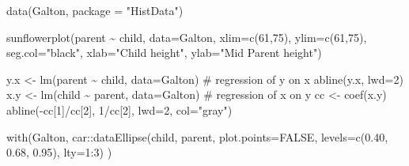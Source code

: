 \documentclass[
  letterpaper,
  10pt,
  krantz2]{krantz}
\makeatletter
\newenvironment{Shaded}{\begin{snugshade}}{\end{snugshade}}
\newcommand{\AttributeTok}[1]{\textcolor[rgb]{0.40,0.45,0.13}{#1}}
\newcommand{\CommentTok}[1]{\textcolor[rgb]{0.37,0.37,0.37}{#1}}
\newcommand{\ConstantTok}[1]{\textcolor[rgb]{0.56,0.35,0.01}{#1}}
\newcommand{\DecValTok}[1]{\textcolor[rgb]{0.68,0.00,0.00}{#1}}
\newcommand{\FloatTok}[1]{\textcolor[rgb]{0.68,0.00,0.00}{#1}}
\newcommand{\FunctionTok}[1]{\textcolor[rgb]{0.28,0.35,0.67}{#1}}
\newcommand{\NormalTok}[1]{\textcolor[rgb]{0.00,0.23,0.31}{#1}}
\newcommand{\OtherTok}[1]{\textcolor[rgb]{0.00,0.23,0.31}{#1}}
\newcommand{\SpecialCharTok}[1]{\textcolor[rgb]{0.37,0.37,0.37}{#1}}
\newcommand{\StringTok}[1]{\textcolor[rgb]{0.13,0.47,0.30}{#1}}
\newenvironment{kframe}{%
  \medskip{}
  \setlength{\fboxsep}{.8em}
  \def\at@end@of@kframe{}%
  \ifinner\ifhmode%
  \def\at@end@of@kframe{\end{minipage}}%
  \begin{minipage}{\columnwidth}%
  \fi\fi%
  \def\FrameCommand##1{\hskip\@totalleftmargin \hskip-\fboxsep
  \colorbox{shadecolor}{##1}\hskip-\fboxsep
      \hskip-\linewidth \hskip-\@totalleftmargin \hskip\columnwidth}%
  \MakeFramed {\advance\hsize-\width
    \@totalleftmargin\z@ \linewidth\hsize
    \@setminipage}}%
{\par\unskip\endMakeFramed%
  \at@end@of@kframe}
\renewenvironment{Shaded}{\begin{kframe}}{\end{kframe}}
\makeatother
\begin{document}
\begin{Shaded}
\begin{Highlighting}[]
\FunctionTok{data}\NormalTok{(Galton, }\AttributeTok{package =} \StringTok{"HistData"}\NormalTok{)}

\FunctionTok{sunflowerplot}\NormalTok{(parent }\SpecialCharTok{\textasciitilde{}}\NormalTok{ child, }\AttributeTok{data=}\NormalTok{Galton, }
      \AttributeTok{xlim=}\FunctionTok{c}\NormalTok{(}\DecValTok{61}\NormalTok{,}\DecValTok{75}\NormalTok{), }
      \AttributeTok{ylim=}\FunctionTok{c}\NormalTok{(}\DecValTok{61}\NormalTok{,}\DecValTok{75}\NormalTok{), }
      \AttributeTok{seg.col=}\StringTok{"black"}\NormalTok{, }
        \AttributeTok{xlab=}\StringTok{"Child height"}\NormalTok{, }
      \AttributeTok{ylab=}\StringTok{"Mid Parent height"}\NormalTok{)}

\NormalTok{y.x }\OtherTok{\textless{}{-}} \FunctionTok{lm}\NormalTok{(parent }\SpecialCharTok{\textasciitilde{}}\NormalTok{ child, }\AttributeTok{data=}\NormalTok{Galton)     }\CommentTok{\# regression of y on x}
\FunctionTok{abline}\NormalTok{(y.x, }\AttributeTok{lwd=}\DecValTok{2}\NormalTok{)}
\NormalTok{x.y }\OtherTok{\textless{}{-}} \FunctionTok{lm}\NormalTok{(child }\SpecialCharTok{\textasciitilde{}}\NormalTok{ parent, }\AttributeTok{data=}\NormalTok{Galton)     }\CommentTok{\# regression of x on y}
\NormalTok{cc }\OtherTok{\textless{}{-}} \FunctionTok{coef}\NormalTok{(x.y)}
\FunctionTok{abline}\NormalTok{(}\SpecialCharTok{{-}}\NormalTok{cc[}\DecValTok{1}\NormalTok{]}\SpecialCharTok{/}\NormalTok{cc[}\DecValTok{2}\NormalTok{], }\DecValTok{1}\SpecialCharTok{/}\NormalTok{cc[}\DecValTok{2}\NormalTok{], }\AttributeTok{lwd=}\DecValTok{2}\NormalTok{, }\AttributeTok{col=}\StringTok{"gray"}\NormalTok{)}

\FunctionTok{with}\NormalTok{(Galton, }
\NormalTok{     car}\SpecialCharTok{::}\FunctionTok{dataEllipse}\NormalTok{(child, parent, }
         \AttributeTok{plot.points=}\ConstantTok{FALSE}\NormalTok{, }
         \AttributeTok{levels=}\FunctionTok{c}\NormalTok{(}\FloatTok{0.40}\NormalTok{, }\FloatTok{0.68}\NormalTok{, }\FloatTok{0.95}\NormalTok{), }
         \AttributeTok{lty=}\DecValTok{1}\SpecialCharTok{:}\DecValTok{3}\NormalTok{)}
\NormalTok{    )}
\end{Highlighting}
\end{Shaded}
\end{document}
